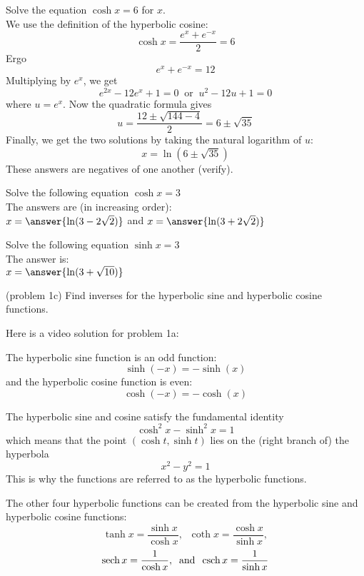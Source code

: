 \documentclass[handout]{ximera}
\begin{document}
\begin{example}[example 1]
Solve the equation $\cosh x = 6$ for $x$.\\
We use the definition of the hyperbolic cosine:
\[
\cosh x = \frac{e^x + e^{-x}}{2} = 6
\]
Ergo
\[
e^x +e^{-x} = 12
\]
Multiplying by $e^x$, we get
\[
e^{2x} - 12e^x +1 = 0 \;\; \mbox{or} \;\; u^2 - 12u + 1 = 0
\]
where $u = e^x$.  Now the quadratic formula gives
\[
u = \frac{12 \pm \sqrt{144 - 4}}{2} = 6 \pm \sqrt{35}
\]
Finally, we get the two solutions by taking the natural logarithm of $u$:
\[
x = \ln\left(6 \pm \sqrt{35}\right)
\]
These answers are negatives of one another (verify).
\end{example}

\begin{problem}[problem 1a]
Solve the following equation $\cosh x = 3$\\
The answers are (in increasing order):\\
$x = \answer{\ln(3-2\sqrt 2)}$ and $x = \answer{\ln(3+2\sqrt 2)}$
\end{problem}


\begin{problem}[problem 1b]
Solve the following equation $\sinh x = 3$\\
The answer is:\\
$x = \answer{\ln(3+\sqrt{10})}$
\end{problem}

\begin{problem}(problem 1c) 
Find inverses for the hyperbolic sine and hyperbolic cosine functions.
\end{problem}

Here is a video solution for problem 1a:\\
\begin{foldable}
\end{foldable}

The hyperbolic sine function is an odd function:
\[
\sinh(-x) = -\sinh(x)
\]
and the hyperbolic cosine function is even:
\[
\cosh(-x) = -\cosh(x)
\]

The hyperbolic sine and cosine satisfy the fundamental identity
\[
\cosh^2 x - \sinh^2 x =1
\]
which means that the point $(\cosh t, \sinh t)$ lies on the (right branch of) the hyperbola
\[
x^2 -y^2 = 1
\]
This is why the functions are referred to as the hyperbolic functions.

The other four hyperbolic functions can be created from the hyperbolic sine and hyperbolic cosine functions:
\[
\tanh x = \frac{\sinh x}{\cosh x},\;\; \coth x = \frac{\cosh x}{\sinh x},
\]
\[
\operatorname{sech} x = \frac{1}{\cosh x}, \;\; \mbox{and}\;\; \operatorname{csch} x = \frac{1}{\sinh x}
\]
\end{document}
